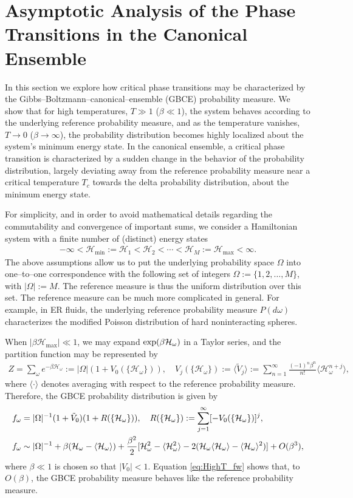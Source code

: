 \documentclass[english,12pt]{ttuthes}
\newcommand{\Hc}{\mathcal{H}}
\newcommand{\HM}{\mathcal{H}_{\text{max}}}
\newcommand{\Hm}{\mathcal{H}_{\text{min}}}
\begin{document}
\section{Asymptotic Analysis of the Phase Transitions in the Canonical Ensemble}
\label{sec:Asymp_Can_Ens_Phase_Trans}
%
In this section we explore how critical phase transitions may be
characterized by the Gibbs--Boltzmann--canonical--ensemble (GBCE)
probability measure. We show that for high temperatures, $T\gg1$
($\beta\ll1$), the system behaves according to the underlying reference
probability measure, and as the temperature vanishes, $T\to0$ ($\beta\to\infty$),
the probability distribution becomes highly localized about the
system's minimum energy state. In the canonical ensemble, a critical
phase transition is characterized by a sudden change in the behavior
of the probability distribution, largely deviating away from the
reference probability measure near a critical temperature $T_c$
towards the delta probability distribution, about the minimum energy
state.  

For simplicity, and in order to avoid mathematical details regarding
the commutability and convergence of important sums, we consider a
Hamiltonian system with a finite number of (distinct) energy states  
%
\begin{align}
  -\infty<\Hm:=\Hc_1<\Hc_2<\cdots<\Hc_M:=\HM<\infty.
\end{align}
%
The above assumptions allow us to put the underlying probability space
$\Omega$ into one--to--one correspondence with the following set of integers
$\Omega:=\{1,2,\ldots,M\}$, with $|\Omega|:=M$. The reference measure is thus the
uniform distribution over this set. The reference measure can be much
more complicated in general. For example, in ER fluids, the underlying
reference probability measure $P(d\omega)$ characterizes the modified
Poisson distribution of hard noninteracting spheres.  

When $|\beta\HM|\ll1$, we may expand $\exp(\-\beta\Hc_\omega)$ in a Taylor
series, and the partition function may be represented by
%
\begin{align}\label{eq:HighT_Z}
  Z=\sum_\omega e^{-\beta\Hc_\omega}:=|\Omega|(1+V_0(\{\Hc_\omega\})), \quad
  V_j(\{\Hc_\omega\}):= \langle\tilde{V}_j\rangle:=\sum_{n=1}^\infty\frac{(-1)^n\beta^n}{n!}\langle\Hc_\omega^{n+j}\rangle,
\end{align}
%
where $\langle\cdot\rangle$ denotes averaging with respect to the reference
probability measure. Therefore, the GBCE probability distribution is
given by 
%
\begin{align}\label{eq:HighT_fw}
  f_\omega&=|\Omega|^{-1}(1+\tilde{V}_0)(1+R(\{\Hc_\omega\})), \quad
  R(\{\Hc_\omega\}):=\sum_{j=1}^\infty[-V_0(\{\Hc_\omega\})]^j,\\
  f_\omega&\sim|\Omega|^{-1}+\beta(\Hc_\omega-\langle\Hc_\omega\rangle)
    +\frac{\beta^2}{2}[\Hc_\omega^2-\langle\Hc_\omega^2\rangle
       -2(\Hc_\omega\langle\Hc_\omega\rangle-\langle\Hc_\omega\rangle^2)]+O(\beta^3),
       \notag
\end{align}
%
where $\beta\ll1$ is chosen so that $|V_0|<1$. Equation \eqref{eq:HighT_fw}
shows that, to $O(\beta)$, the GBCE probability measure behaves like the
reference probability measure.
\end{document}
